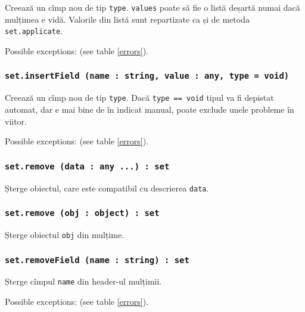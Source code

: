 Creează un cîmp nou de tip \texttt{type}. \texttt{values} poate să fie o listă deșartă numai dacă mulțimea e vidă. Valorile din listă sunt repartizate ca și de metoda \texttt{set.applicate}.

Possible exceptions:  (see table \ref{errors}).

\subsubsection{\texttt{set.insertField (name : string, value : any, type = void)}}

Creează un cîmp nou de tip \texttt{type}. Dacă \texttt{type == void} tipul va fi depistat automat, dar e mai bine de în indicat manual, poate exclude unele probleme în viitor.

Possible exceptions:  (see table \ref{errors}).

\subsubsection{\texttt{set.remove (data : any ...) : set}}

Șterge obiectul, care este compatibil cu descrierea \texttt{data}.

\subsubsection{\texttt{set.remove (obj : object) : set}}

Șterge obiectul \texttt{obj} din mulțime.

\subsubsection{\texttt{set.removeField (name : string) : set}}

Șterge cîmpul \texttt{name} din header-ul mulțimii.

Possible exceptions:  (see table \ref{errors}).

